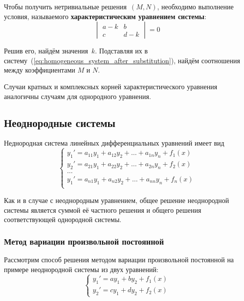 Чтобы получить нетривиальные решения~$(M, N)$, необходимо выполнение условия, называемого \textbf{характеристическим уравнением системы}:
\begin{equation*}
\begin{vmatrix}
a - k & b \\
c & d - k
\end{vmatrix} = 0
\end{equation*}

Решив его, найдём значения~$k$.
Подставляя их в систему~(\ref*{eq:homogeneous_system_after_substitution}), найдём соотношения между коэффициентами $M$ и $N$.

Случаи кратных и комплексных корней характеристического уравнения аналогичны случаям для однородного уравнения.

\subsection{Неоднородные системы}
Неднородная система линейных дифференциальных уравнений имеет вид
\begin{equation*}
\begin{cases}
y_1' = a_{11} y_1 + a_{12} y_2 + \ldots + a_{1n} y_n + f_1(x) \\
y_2' = a_{21} y_1 + a_{22} y_2 + \ldots + a_{2n} y_n + f_2(x) \\
\ldots \\
y_1' = a_{n1} y_1 + a_{n2} y_2 + \ldots + a_{nn} y_n + f_n(x) \\
\end{cases}
\end{equation*}

Как и в случае с неоднородным уравнением, общее решение неоднородной системы является суммой её частного решения и общего решения соответствующей однородной системы.

\subsubsection{Метод вариации произвольной постоянной}
 Рассмотрим способ решения методом вариации произвольной постоянной на примере неоднородной системы из двух уравнений:
\begin{equation*}
\begin{cases}
y_1' = ay_1 + by_2 + f_1(x) \\
y_2' = cy_1 + dy_2 + f_2(x)
\end{cases}
\end{equation*}

